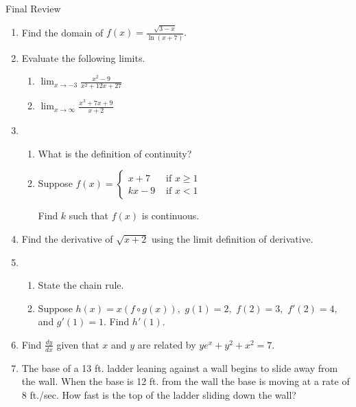 \documentclass[10pt]{article}
\newcommand{\ds}{\displaystyle}
\theoremstyle{definition}
\begin{document}
\thispagestyle{empty}

Final Review \hfill

\vspace{.5in}
\begin{enumerate}
\setlength{\itemindent}{-5mm}

\item Find the domain of $f(x) = \frac{\sqrt{3-x}}{\ln (x+7)}.$

\item Evaluate the following limits.
\begin{enumerate}
\item $\ds \lim_{x \to -3} \frac{x^2-9}{x^2+12x+27}$
\item $\ds \lim_{x \to \infty} \frac{x^3+7x+9}{x+2}$
\end{enumerate}

\item 
\begin{enumerate}
\item What is the definition of continuity?
\item Suppose $\ds f(x) = \begin{cases} x+7 & \text{ if } x \ge 1 \\ kx - 9 & \text{ if } x<1 \end{cases}$ 

Find $k$ such that $f(x)$ is continuous. 
\end{enumerate}

\item Find the derivative of $\sqrt{x+2}$ using the limit definition of derivative.

\item
\begin{enumerate}
\item State the chain rule.
\item Suppose $h(x) = x(f \circ g(x)),$ $g(1)=2,$ $f(2)=3,$ $f'(2)=4,$ and $g'(1)=1.$ Find $h'(1).$
\end{enumerate}

\item Find $\frac{dy}{dx}$ given that $x$ and $y$ are related by $ye^x + y^2 + x^2 =7$.

\item The base of a 13 ft. ladder leaning against a wall begins to slide away from the wall. When the base is 12 ft. from the wall the base is moving at a rate of 8 ft./sec. How fast is the top of the ladder sliding down the wall?


\end{enumerate}
\end{document}
